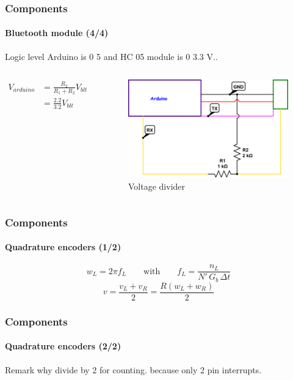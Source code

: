 \documentclass{beamer}
\begin{document}
\begin{frame}
\frametitle{Components}
\framesubtitle{Bluetooth module (4/4)}
Logic level Arduino is 0 5 and HC 05 module is 0 3.3 V..
\begin{columns}[c]

\begin{align*} 
V_{arduino} &=  \frac{R_2}{R_1+R_2}V_{blt} \\[0.4cm]
 &=  \frac{2.2}{3.2}V_{blt}
\end{align*}

\begin{figure}[hbtp]
\centering
\includegraphics[scale=0.5]{figures/voltage-divider.png}
\caption{Voltage divider}
\end{figure}

\end{columns}
\end{frame}


\begin{frame}
\frametitle{Components}
\framesubtitle{Quadrature encoders (1/2)}
$$ 
w_L = 2\pi f_L
\qquad\text{with}\qquad	
f_L = \frac{n_L}{N' \, G_b \, \Delta{t} }
$$
$$ 
v = \frac{v_L + v_R}{2} = \frac{R(w_L + w_R)}{2}
$$
\end{frame}


\begin{frame}
\frametitle{Components}
\framesubtitle{Quadrature encoders (2/2)}
Remark why divide by 2 for counting. because only 2 pin interrupts.
\end{frame}

\end{document}
